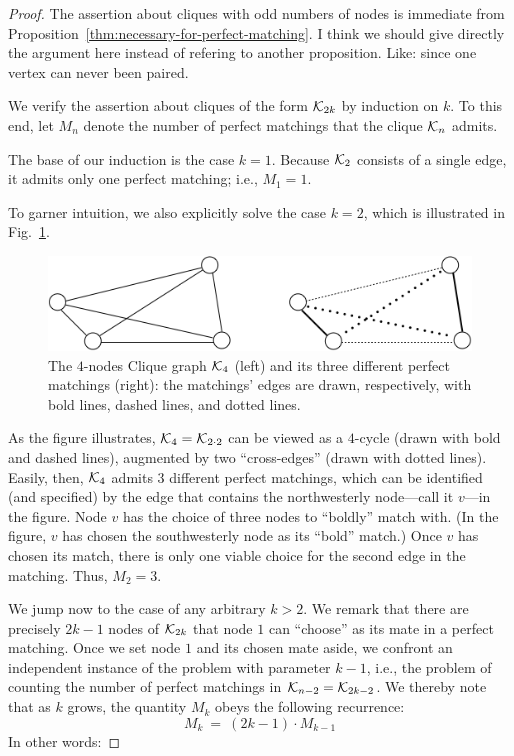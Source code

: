 \begin{proof}
The assertion about cliques with odd numbers of nodes is immediate
from Proposition~\ref{thm:necessary-for-perfect-matching}.
{\Denis I think we should give directly the argument here instead of refering to another proposition.
Like: since one vertex can never been paired.}

We verify the assertion about cliques of the form $\mbox{$\cal K$}_{2k}$ by
induction on $k$.  To this end, let $M_n$ denote the number of perfect
matchings that the clique $\mbox{$\cal K$}_n$ admits.

The base of our induction is the case $k=1$.  Because $\mbox{$\cal K$}_{2}$
consists of a single edge, it admits only one perfect matching; i.e.,
$M_1 = 1$.

To garner intuition, we also explicitly solve the case $k=2$, which is
illustrated in Fig.~\ref{fig:AllPerfectMatchings}.
\begin{figure}[hbt]
\begin{center}
       \includegraphics[scale=0.55]{FiguresGraph/perfectmatchingAll}
       \caption{The $4$-nodes Clique graph  $\mbox{$\cal K$}_4$ (left) and its three different perfect matchings (right): 
       the matchings' edges are drawn, respectively, with bold lines, dashed lines, and dotted lines.}
  \label{fig:AllPerfectMatchings}
\end{center}
\end{figure}
As the figure illustrates, $\mbox{$\cal K$}_4 = \mbox{$\cal K$}_{2 \cdot 2}$ can be viewed as a
$4$-cycle (drawn with bold and dashed lines), augmented by two
``cross-edges'' (drawn with dotted lines).  Easily, then, $\mbox{$\cal K$}_4$
admits $3$ different perfect matchings, which can be identified (and
specified) by the edge that contains the northwesterly node---call it
$v$---in the figure.  Node $v$ has the choice of three nodes to
``boldly'' match with. (In the figure, $v$ has chosen the
southwesterly node as its ``bold'' match.)  Once $v$ has chosen its
match, there is only one viable choice for the second edge in the
matching.  Thus, $M_2=3$.

We jump now to the case of any arbitrary $k > 2$.  We remark that
there are precisely $2k-1$ nodes of $\mbox{$\cal K$}_{2k}$ that node $1$ can
``choose'' as its mate in a perfect matching.  Once we set node $1$
and its chosen mate aside, we confront an independent instance of the
problem with parameter $k-1$, i.e., the problem of counting the number
of perfect matchings in $\mbox{$\cal K$}_{n-2} = \mbox{$\cal K$}_{2k-2}$.  We thereby note that
as $k$ grows, the quantity $M_k$ obeys the following recurrence:
\[ M_k \ = \ (2k-1) \cdot M_{k-1} \]
In other words:


\end{proof}
